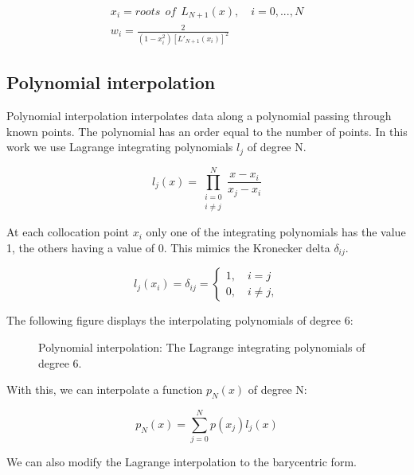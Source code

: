 \begin{gather}
	x_i = roots \:\: of \:\: L_{N + 1}(x), \quad i = 0, ..., N \\
	w_i = \frac{2}{(1-x_i^2)\left [ L'_{N + 1}(x_i) \right ]^2}
\end{gather}

\subsection{Polynomial interpolation} \label{section:spectral_element_method:spectral_approximation:polynomial_interpolation}
Polynomial interpolation interpolates data along a polynomial passing through known points. The
polynomial has an order equal to the number of points. In this work we use Lagrange integrating
polynomials $l_j$ of degree N.

\begin{equation}
	l_j(x) = \prod_{\substack{i = 0 \\ i \neq j}}^{N}\frac{x- x_i}{x_j - x_i}
\end{equation}

At each collocation point $x_i$ only one of the integrating polynomials has the value 1, the others
having a value of 0. This mimics the Kronecker delta $\delta_{ij}$.

\begin{equation}
	l_j(x_i) = \delta_{ij} = \left\{\begin{matrix}
	1, \quad i = j\\ 
	0, \quad i \neq j,
	\end{matrix}\right.
\end{equation}

The following figure displays the interpolating polynomials of degree 6:

\begin{figure}[H]
	\centering
	
	\caption{Polynomial interpolation: The Lagrange integrating polynomials of degree 6.}
	\label{fig:interpolants}
\end{figure}

With this, we can interpolate a function $p_N \left( x \right)$ of degree N:

\begin{equation}
	p_N(x) = \sum_{j = 0}^{N}p(x_j)l_j(x)
\end{equation}

We can also modify the Lagrange interpolation to the barycentric form.

